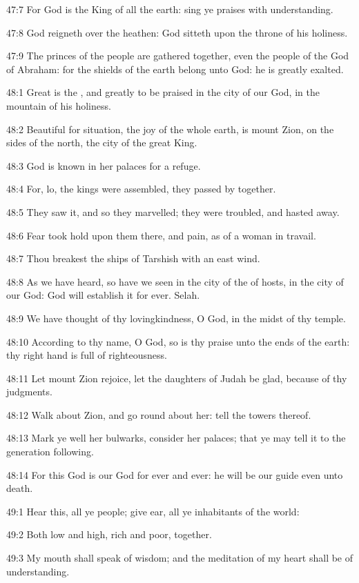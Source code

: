 47:7 For God is the King of all the earth: sing ye praises with understanding.

47:8 God reigneth over the heathen: God sitteth upon the throne of his holiness.

47:9 The princes of the people are gathered together, even the people of the God of Abraham: for the shields of the earth belong unto God: he is greatly exalted.



48:1 Great is the \LORD, and greatly to be praised in the city of our God, in the mountain of his holiness.

48:2 Beautiful for situation, the joy of the whole earth, is mount Zion, on the sides of the north, the city of the great King.

48:3 God is known in her palaces for a refuge.

48:4 For, lo, the kings were assembled, they passed by together.

48:5 They saw it, and so they marvelled; they were troubled, and hasted away.

48:6 Fear took hold upon them there, and pain, as of a woman in travail.

48:7 Thou breakest the ships of Tarshish with an east wind.

48:8 As we have heard, so have we seen in the city of the \LORD of hosts, in the city of our God: God will establish it for ever. Selah.

48:9 We have thought of thy lovingkindness, O God, in the midst of thy temple.

48:10 According to thy name, O God, so is thy praise unto the ends of the earth: thy right hand is full of righteousness.

48:11 Let mount Zion rejoice, let the daughters of Judah be glad, because of thy judgments.

48:12 Walk about Zion, and go round about her: tell the towers thereof.

48:13 Mark ye well her bulwarks, consider her palaces; that ye may tell it to the generation following.

48:14 For this God is our God for ever and ever: he will be our guide even unto death.



49:1 Hear this, all ye people; give ear, all ye inhabitants of the world:

49:2 Both low and high, rich and poor, together.

49:3 My mouth shall speak of wisdom; and the meditation of my heart shall be of understanding.

